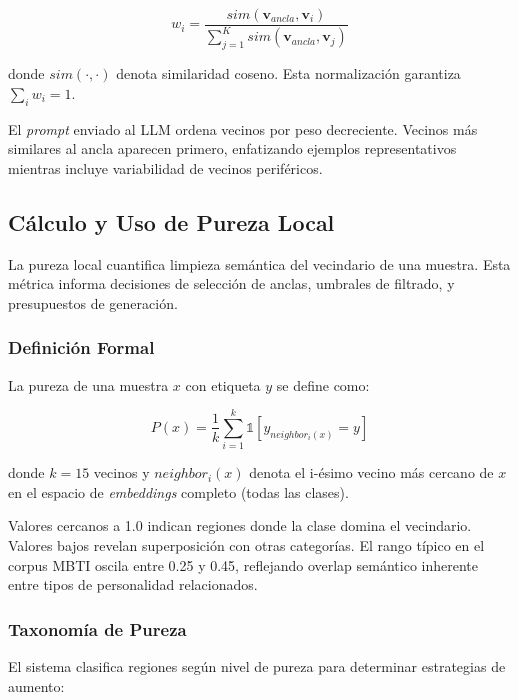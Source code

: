 \begin{equation}
w_i = \frac{sim(\mathbf{v}_{ancla}, \mathbf{v}_i)}{\sum_{j=1}^{K} sim(\mathbf{v}_{ancla}, \mathbf{v}_j)}
\label{eq:weight_neighbors}
\end{equation}

donde $sim(\cdot, \cdot)$ denota similaridad coseno. Esta normalización garantiza $\sum_i w_i = 1$.

El \textit{prompt} enviado al LLM ordena vecinos por peso decreciente. Vecinos más similares al ancla aparecen primero, enfatizando ejemplos representativos mientras incluye variabilidad de vecinos periféricos.

\subsection{Cálculo y Uso de Pureza Local}
\label{subsec:pureza}

La pureza local cuantifica limpieza semántica del vecindario de una muestra. Esta métrica informa decisiones de selección de anclas, umbrales de filtrado, y presupuestos de generación.

\subsubsection*{Definición Formal}

La pureza de una muestra $x$ con etiqueta $y$ se define como:

\begin{equation}
P(x) = \frac{1}{k} \sum_{i=1}^{k} \mathbb{1}[y_{neighbor_i(x)} = y]
\label{eq:purity_formal}
\end{equation}

donde $k=15$ vecinos y $neighbor_i(x)$ denota el i-ésimo vecino más cercano de $x$ en el espacio de \textit{embeddings} completo (todas las clases).

Valores cercanos a 1.0 indican regiones donde la clase domina el vecindario. Valores bajos revelan superposición con otras categorías. El rango típico en el corpus MBTI oscila entre 0.25 y 0.45, reflejando overlap semántico inherente entre tipos de personalidad relacionados.

\subsubsection*{Taxonomía de Pureza}

El sistema clasifica regiones según nivel de pureza para determinar estrategias de aumento:

